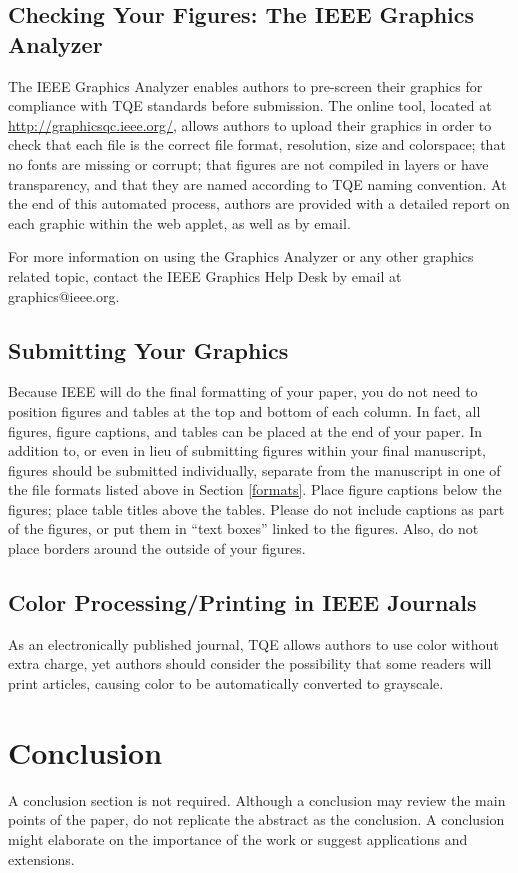 \documentclass{ieeeaccess}
\begin{document}
\subsection{Checking Your Figures: The IEEE Graphics Analyzer}
The IEEE Graphics Analyzer enables authors to pre-screen their graphics for
compliance with TQE standards before submission.
The online tool, located at
\underline{http://graphicsqc.ieee.org/}, allows authors to
upload their graphics in order to check that each file is the correct file
format, resolution, size and colorspace; that no fonts are missing or
corrupt; that figures are not compiled in layers or have transparency, and
that they are named according to TQE naming
convention. At the end of this automated process, authors are provided with
a detailed report on each graphic within the web applet, as well as by
email.

For more information on using the Graphics Analyzer or any other graphics
related topic, contact the IEEE Graphics Help Desk by email at
graphics@ieee.org.

\subsection{Submitting Your Graphics}
Because IEEE will do the final formatting of your paper,
you do not need to position figures and tables at the top and bottom of each
column. In fact, all figures, figure captions, and tables can be placed at
the end of your paper. In addition to, or even in lieu of submitting figures
within your final manuscript, figures should be submitted individually,
separate from the manuscript in one of the file formats listed above in
Section \ref{formats}. Place figure captions below the figures; place table titles
above the tables. Please do not include captions as part of the figures, or
put them in ``text boxes'' linked to the figures. Also, do not place borders
around the outside of your figures.

\subsection{Color Processing/Printing in IEEE Journals}
As an electronically published journal, TQE allows authors to use color without extra charge,
yet authors should consider the possibility that some readers will print articles,
causing color to be automatically converted to grayscale.


\section{Conclusion}
A conclusion section is not required. Although a conclusion may review the
main points of the paper, do not replicate the abstract as the conclusion. A
conclusion might elaborate on the importance of the work or suggest
applications and extensions.
\end{document}
